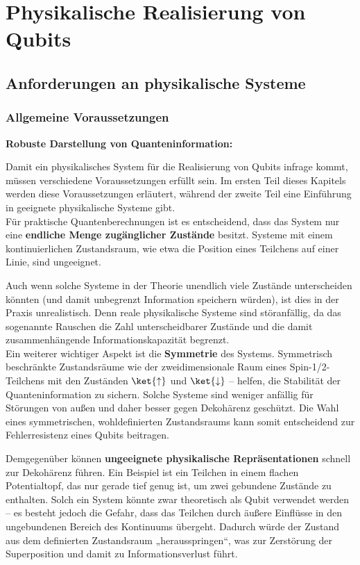\section{Physikalische Realisierung von Qubits }
\label{sec: Physikalische Realisierung}
\subsection{Anforderungen an physikalische Systeme }
\label{subsec: Anforderungen (Allgemein, Divincenzo-Kriterien, Dekohärenz)}
\subsubsection{Allgemeine Voraussetzungen}

\textbf{Robuste Darstellung von Quanteninformation:}

Damit ein physikalisches System für die Realisierung von Qubits infrage kommt, müssen verschiedene Voraussetzungen erfüllt sein. Im ersten Teil dieses Kapitels werden diese Voraussetzungen erläutert, während der zweite Teil eine Einführung in geeignete physikalische Systeme gibt.\\

Für praktische Quantenberechnungen ist es entscheidend, dass das System nur eine \textbf{endliche Menge zugänglicher Zustände} besitzt. Systeme mit einem kontinuierlichen Zustandsraum, wie etwa die Position eines Teilchens auf einer Linie, sind ungeeignet. 


Auch wenn solche Systeme in der Theorie unendlich viele Zustände unterscheiden könnten (und damit unbegrenzt Information speichern würden), ist dies in der Praxis unrealistisch. Denn reale physikalische Systeme sind störanfällig, da das sogenannte Rauschen die Zahl unterscheidbarer Zustände und die damit zusammenhängende Informationskapazität begrenzt. \\

Ein weiterer wichtiger Aspekt ist die \textbf{Symmetrie} des Systems. Symmetrisch beschränkte Zustandsräume wie der zweidimensionale Raum eines Spin-1/2-Teilchens mit den Zuständen $\ket{\uparrow}$ und $\ket{\downarrow}$ – helfen, die Stabilität der Quanteninformation zu sichern. Solche Systeme sind weniger anfällig für Störungen von außen und daher besser gegen Dekohärenz geschützt. Die Wahl eines symmetrischen, wohldefinierten Zustandsraums kann somit entscheidend zur Fehlerresistenz eines Qubits beitragen.


Demgegenüber können \textbf{ungeeignete physikalische Repräsentationen} schnell zur Dekohärenz führen. Ein Beispiel ist ein Teilchen in einem flachen Potentialtopf, das nur gerade tief genug ist, um zwei gebundene Zustände zu enthalten. Solch ein System könnte zwar theoretisch als Qubit verwendet werden – es besteht jedoch die Gefahr, dass das Teilchen durch äußere Einflüsse in den ungebundenen Bereich des Kontinuums übergeht. Dadurch würde der Zustand aus dem definierten Zustandsraum „herausspringen“, was zur Zerstörung der Superposition und damit zu Informationsverlust führt.\\

